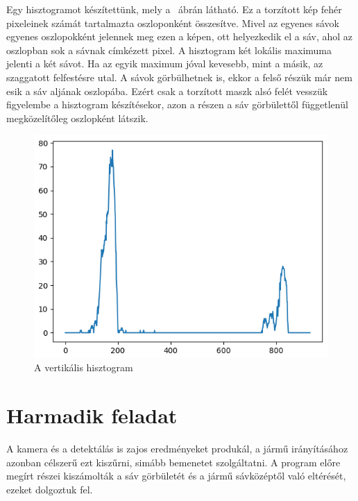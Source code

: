 Egy hisztogramot készítettünk, mely a ~ábrán látható. Ez a torzított kép fehér pixeleinek számát tartalmazta oszloponként összesítve. Mivel az egyenes sávok egyenes oszlopokként jelennek meg ezen a képen, ott helyezkedik el a sáv, ahol az oszlopban sok a sávnak címkézett pixel. A hisztogram két lokális maximuma jelenti a két sávot. Ha az egyik maximum jóval kevesebb, mint a másik, az szaggatott felfestésre utal. A sávok görbülhetnek is, ekkor a felső részük már nem esik a sáv aljának oszlopába. Ezért csak a torzított maszk alsó felét vesszük figyelembe a hisztogram készítésekor, azon a részen a sáv görbülettől függetlenül megközelítőleg oszlopként látszik.


\begin{figure}[!ht]
	\includegraphics[width=150mm,keepaspectratio]{figures/m09/histogram.png}
	\caption{A vertikális hisztogram}
	\label{fig:Histogram}
\end{figure}
\newpage

\section{Harmadik feladat}
A kamera és a detektálás is zajos eredményeket produkál, a jármű irányításához azonban célszerű ezt kiszűrni, simább bemenetet szolgáltatni. A program előre megírt részei kiszámolták a sáv görbületét és a jármű sávközéptől való eltérését, ezeket dolgoztuk fel. 

